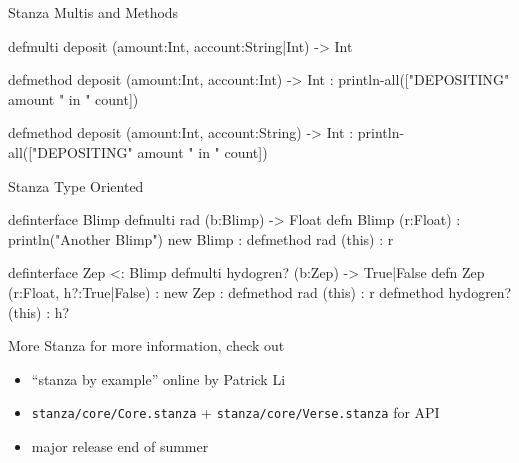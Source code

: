 \begin{frame}[fragile]{Stanza Multis and Methods}
\begin{scala}
defmulti deposit (amount:Int, account:String|Int) -> Int

defmethod deposit (amount:Int, account:Int) -> Int :
  println-all(["DEPOSITING" amount " in " count])

defmethod deposit (amount:Int, account:String) -> Int :
  println-all(["DEPOSITING" amount " in " count])
\end{scala}
\end{frame}

\begin{frame}[fragile]{Stanza Type Oriented}
\begin{stanza}
definterface Blimp
defmulti rad (b:Blimp) -> Float
defn Blimp (r:Float) :
  println("Another Blimp")
  new Blimp :
    defmethod rad (this) : r

definterface Zep <: Blimp
defmulti hydogren? (b:Zep) -> True|False
defn Zep (r:Float, h?:True|False) :
  new Zep :
    defmethod rad (this) : r
    defmethod hydogren? (this) : h?
\end{stanza}
\end{frame}

\begin{frame}[fragile]{More Stanza}
for more information, check out
\begin{itemize}
\item ``stanza by example'' online by Patrick Li
\item \verb+stanza/core/Core.stanza+ + \verb+stanza/core/Verse.stanza+ for API
\item major release end of summer
\end{itemize}
\end{frame}

